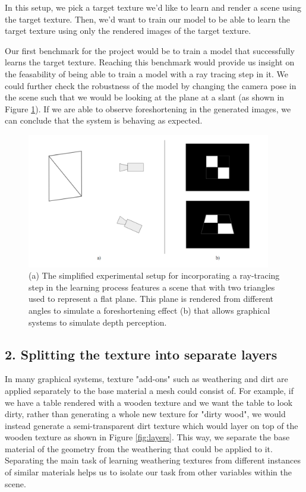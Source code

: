 \documentclass[letterpaper,doc,natbib]{apa6}
\begin{document}
In this setup, we pick a target texture we'd like to learn and render a scene using the target texture. Then, we'd want to train our model to be able to learn the target texture using only the rendered images of the target texture.

Our first benchmark for the project would be to train a model that successfully learns the target texture. Reaching this benchmark would provide us insight on the feasability of being able to train a model with a ray tracing step in it. We could further check the robustness of the model by changing the camera pose in the scene such that we would be looking at the plane at a slant (as shown in Figure \ref{fig:perspective}). If we are able to observe foreshortening in the generated images, we can conclude that the system is behaving as expected.

\begin{figure}
\centering
\includegraphics[width=0.95\textwidth]{perspective.png}
\caption{\label{fig:perspective} (a) The simplified experimental setup for incorporating a ray-tracing step in the learning process features a scene that with two triangles used to represent a flat plane. This plane is rendered from different angles to simulate a foreshortening effect (b) that allows graphical systems to simulate depth perception.}
\end{figure}

\subsection{2. Splitting the texture into separate layers}

In many graphical systems, texture "add-ons" such as weathering and dirt are applied separately to the base material a mesh could consist of. For example, if we have a table rendered with a wooden texture and we want the table to look dirty, rather than generating a whole new texture for "dirty wood", we would instead generate a semi-transparent dirt texture which would layer on top of the wooden texture as shown in Figure \ref{fig:layers}. This way, we separate the base material of the geometry from the weathering that could be applied to it. Separating the main task of learning weathering textures from different instances of similar materials helps us to isolate our task from other variables within the scene.
\end{document}
